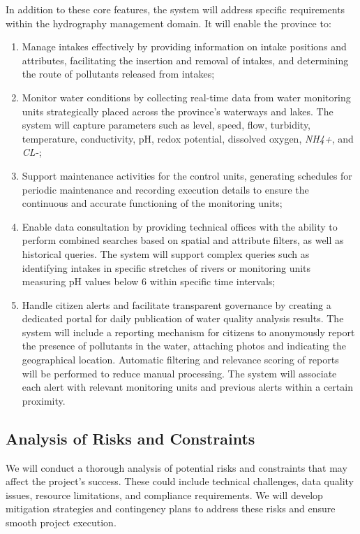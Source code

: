 In addition to these core features, the system will address specific requirements within the hydrography management domain. It will enable the province to:
\begin{enumerate}
    \item Manage intakes effectively by providing information on intake positions and attributes, facilitating the insertion and removal of intakes, and determining the route of pollutants released from intakes;
    \item Monitor water conditions by collecting real-time data from water monitoring units strategically placed across the province's waterways and lakes. The system will capture parameters such as level, speed, flow, turbidity, temperature, conductivity, pH, redox potential, dissolved oxygen, \textit{NH4+}, and \textit{CL-};
    \item Support maintenance activities for the control units, generating schedules for periodic maintenance and recording execution details to ensure the continuous and accurate functioning of the monitoring units;
    \item Enable data consultation by providing technical offices with the ability to perform combined searches based on spatial and attribute filters, as well as historical queries. The system will support complex queries such as identifying intakes in specific stretches of rivers or monitoring units measuring pH values below 6 within specific time intervals;
    \item Handle citizen alerts and facilitate transparent governance by creating a dedicated portal for daily publication of water quality analysis results. The system will include a reporting mechanism for citizens to anonymously report the presence of pollutants in the water, attaching photos and indicating the geographical location. Automatic filtering and relevance scoring of reports will be performed to reduce manual processing. The system will associate each alert with relevant monitoring units and previous alerts within a certain proximity.
\end{enumerate}

\subsection{Analysis of Risks and Constraints}
We will conduct a thorough analysis of potential risks and constraints that may affect the project's success. These could include technical challenges, data quality issues, resource limitations, and compliance requirements. We will develop mitigation strategies and contingency plans to address these risks and ensure smooth project execution.

